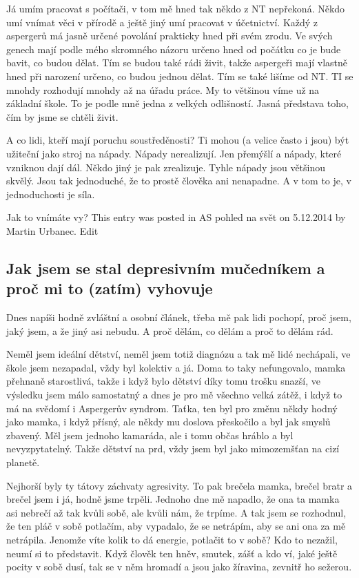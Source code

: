 \documentclass[DIV=calc, paper=a4, fontsize=11pt, twocolumn]{scrartcl}	 %
\begin{document}
Já umím pracovat s počítači, v tom mě hned tak někdo z NT
nepřekoná. Někdo umí vnímat věci v přírodě a ještě jiný umí pracovat v
účetnictví. Každý z aspergerů má jasně určené povolání prakticky hned
při svém zrodu. Ve svých genech mají podle mého skromného názoru
určeno hned od počátku co je bude bavit, co budou dělat. Tím se budou
také rádi živit, takže aspergeři mají vlastně hned při narození
určeno, co budou jednou dělat. Tím se také lišíme od NT. TI se mnohdy
rozhodují mnohdy až na úřadu práce. My to většinou víme už na základní
škole. To je podle mně jedna z velkých odlišností. Jasná představa
toho, čím by jsme se chtěli živit.

A co lidi, kteří mají poruchu soustředěnosti? Ti mohou (a velice často
i jsou) být užiteční jako stroj na nápady. Nápady nerealizují. Jen
přemýšlí a nápady, které vzniknou dají dál. Někdo jiný je pak
zrealizuje. Tyhle nápady jsou většinou skvělý. Jsou tak jednoduché, že
to prostě člověka ani nenapadne. A v tom to je, v jednoduchosti je
síla.

Jak to vnímáte vy?
This entry was posted in AS pohled na svět on 5.12.2014 by Martin
Urbanec. Edit

\subsection*{Jak jsem se stal depresivním mučedníkem a proč mi to (zatím) vyhovuje}


Dnes napíši hodně zvláštní a osobní článek, třeba mě pak lidi pochopí,
proč jsem, jaký jsem, a že jiný asi nebudu. A proč dělám, co dělám a
proč to dělám rád.

Neměl jsem ideální dětství, neměl jsem totiž diagnózu a tak mě lidé
nechápali, ve škole jsem nezapadal, vždy byl kolektiv a já. Doma to
taky nefungovalo, mamka přehnaně starostlivá, takže i když bylo
dětství díky tomu trošku snazší, ve výsledku jsem málo samostatný a
dnes je pro mě všechno velká zátěž, i když to má na svědomí i
Aspergerův syndrom. Taťka, ten byl pro změnu někdy hodný jako mamka, i
když přísný, ale někdy mu doslova přeskočilo a byl jak smyslů
zbavený. Měl jsem jednoho kamaráda, ale i tomu občas hráblo a byl
nevyzpytatelný. Takže dětství na prd, vždy jsem byl jako mimozemšťan
na cizí planetě.

Nejhorší byly ty tátovy záchvaty agresivity. To pak brečela mamka,
brečel bratr a brečel jsem i já, hodně jsme trpěli. Jednoho dne mě
napadlo, že ona ta mamka asi nebrečí až tak kvůli sobě, ale kvůli nám,
že trpíme. A tak jsem se rozhodnul, že ten pláč v sobě potlačím, aby
vypadalo, že se netrápím, aby se ani ona za mě netrápila. Jenomže víte
kolik to dá energie, potlačit to v sobě? Kdo to nezažil, neumí si to
představit. Když člověk ten hněv, smutek, zášť a kdo ví, jaké ještě
pocity v sobě dusí, tak se v něm hromadí a jsou jako žíravina, zevnitř
ho sežerou.
\end{document}
